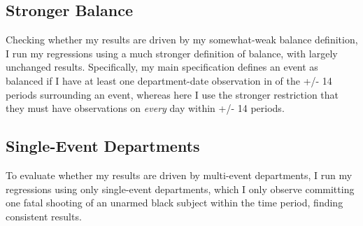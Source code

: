 \subsection{Stronger Balance}
Checking whether my results are driven by my somewhat-weak balance definition, I run my regressions using a much stronger definition of balance, with largely unchanged results. Specifically, my main specification defines an event as balanced if I have at least one department-date observation in of the +/- 14 periods surrounding an event, whereas here I use the stronger restriction that they must have observations on \emph{every} day within +/- 14 periods. \\

\begin{table}
	\begin{center}
		
		\caption[Volume Outcome Estimates, Stronger Balanced]{This table gives volume outcome coefficient estimates for the treatment effect following a shooting event both overall using equation \ref{eq1_DiD} in Panel A and by scrutiny level using equation \ref{eq3_DiDiD} in Panel B.}
		\label{full_DiD_volumes_A04}
	\end{center}
\end{table}

\begin{table}
	\begin{center}
		
		\caption[Rate Outcome Estimates, Stronger Balance]{This table gives rate outcome coefficient estimates for the treatment effect following a shooting event both overall using equation \ref{eq1_DiD} in Panel A and by scrutiny level using equation \ref{eq3_DiDiD} in Panel B.}
		\label{full_DiD_rates_A04}
	\end{center}
\end{table}

\clearpage
\subsection{Single-Event Departments}
To evaluate whether my results are driven by multi-event departments, I run my regressions using only single-event departments, which I only observe committing one fatal shooting of an unarmed black subject within the time period, finding consistent results. \\

